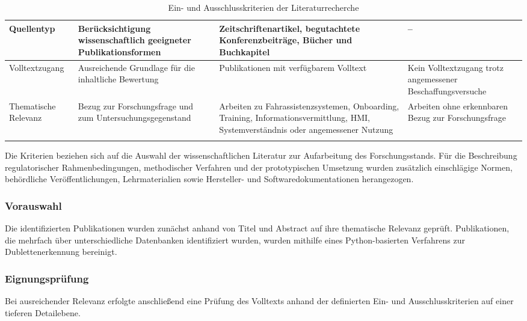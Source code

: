 {\begin{xltabular}{\textwidth}{
    |P{0.22\textwidth}
    |P{0.24\textwidth}
    |P{0.22\textwidth}
    |Y|
}
Quellentyp &
Berücksichtigung wissenschaftlich geeigneter Publikationsformen &
Zeitschriftenartikel, begutachtete Konferenzbeiträge, Bücher und Buchkapitel &
--
\\
\hline

Volltextzugang &
Ausreichende Grundlage für die inhaltliche Bewertung &
Publikationen mit verfügbarem Volltext &
Kein Volltextzugang trotz angemessener Beschaffungsversuche
\\
\hline

Thematische Relevanz &
Bezug zur Forschungsfrage und zum Untersuchungsgegenstand &
Arbeiten zu Fahrassistenzsystemen, Onboarding, Training, Informationsvermittlung, HMI, Systemverständnis oder angemessener Nutzung &
Arbeiten ohne erkennbaren Bezug zur Forschungsfrage
\\
\hline

\caption{Ein- und Ausschlusskriterien der Literaturrecherche}
\label{tab:literatur_einschlusskriterien}
\\

\end{xltabular}
}

Die Kriterien beziehen sich auf die Auswahl der wissenschaftlichen Literatur zur Aufarbeitung des Forschungsstands. Für die Beschreibung regulatorischer Rahmenbedingungen, methodischer Verfahren und der prototypischen Umsetzung wurden zusätzlich einschlägige Normen, behördliche Veröffentlichungen, Lehrmaterialien sowie Hersteller- und Softwaredokumentationen herangezogen.

\subsubsection{Vorauswahl}
\label{subsubsec:Vorauswahl}

Die identifizierten Publikationen wurden zunächst anhand von Titel und Abstract auf ihre thematische Relevanz geprüft. Publikationen, die mehrfach über unterschiedliche Datenbanken identifiziert wurden, wurden mithilfe eines Python-basierten Verfahrens zur Dublettenerkennung bereinigt.

\subsubsection{Eignungsprüfung}
\label{subsubsec:Eignungsprüfung}
Bei ausreichender Relevanz erfolgte anschließend eine Prüfung des Volltexts anhand der definierten Ein- und Ausschlusskriterien auf einer tieferen Detailebene. 

